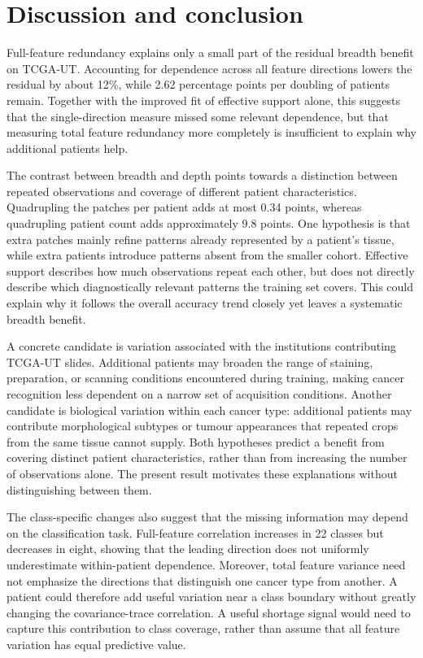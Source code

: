 \section{Discussion and conclusion}
\label{sec:discussion}
Full-feature redundancy explains only a small part of the residual breadth benefit on TCGA-UT. Accounting for dependence across all feature directions lowers the residual by about 12\%, while 2.62 percentage points per doubling of patients remain. Together with the improved fit of effective support alone, this suggests that the single-direction measure missed some relevant dependence, but that measuring total feature redundancy more completely is insufficient to explain why additional patients help.

The contrast between breadth and depth points towards a distinction between repeated observations and coverage of different patient characteristics. Quadrupling the patches per patient adds at most 0.34 points, whereas quadrupling patient count adds approximately 9.8 points. One hypothesis is that extra patches mainly refine patterns already represented by a patient's tissue, while extra patients introduce patterns absent from the smaller cohort. Effective support describes how much observations repeat each other, but does not directly describe which diagnostically relevant patterns the training set covers. This could explain why it follows the overall accuracy trend closely yet leaves a systematic breadth benefit.

A concrete candidate is variation associated with the institutions contributing TCGA-UT slides. Additional patients may broaden the range of staining, preparation, or scanning conditions encountered during training, making cancer recognition less dependent on a narrow set of acquisition conditions. Another candidate is biological variation within each cancer type: additional patients may contribute morphological subtypes or tumour appearances that repeated crops from the same tissue cannot supply. Both hypotheses predict a benefit from covering distinct patient characteristics, rather than from increasing the number of observations alone. The present result motivates these explanations without distinguishing between them.

The class-specific changes also suggest that the missing information may depend on the classification task. Full-feature correlation increases in 22 classes but decreases in eight, showing that the leading direction does not uniformly underestimate within-patient dependence. Moreover, total feature variance need not emphasize the directions that distinguish one cancer type from another. A patient could therefore add useful variation near a class boundary without greatly changing the covariance-trace correlation. A useful shortage signal would need to capture this contribution to class coverage, rather than assume that all feature variation has equal predictive value.

